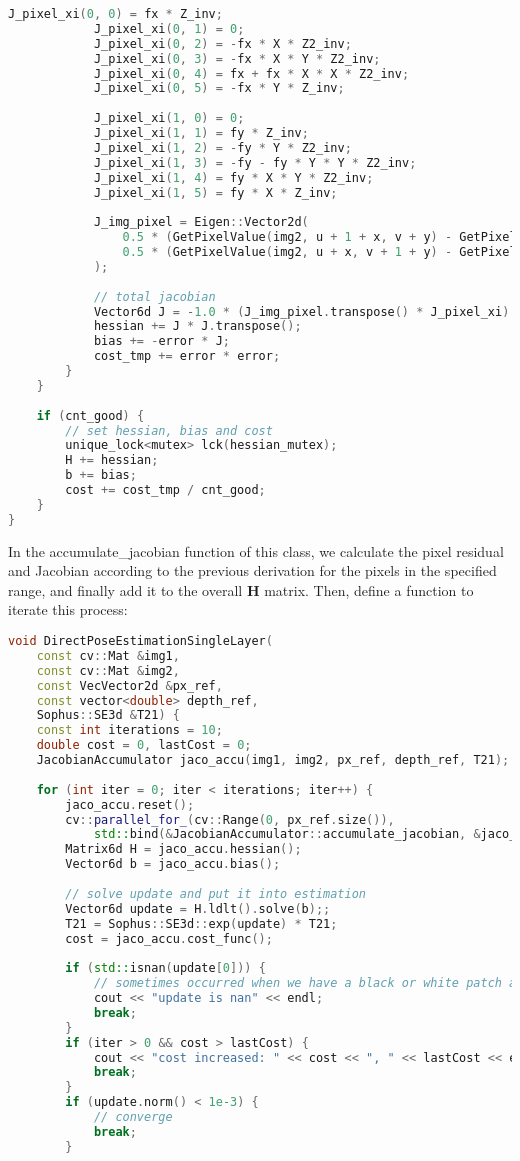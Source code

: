 {\begin{lstlisting}[language=c++,caption=slambook2/ch8/direct_method.cpp（片段）]
			J_pixel_xi(0, 0) = fx * Z_inv;
			J_pixel_xi(0, 1) = 0;
			J_pixel_xi(0, 2) = -fx * X * Z2_inv;
			J_pixel_xi(0, 3) = -fx * X * Y * Z2_inv;
			J_pixel_xi(0, 4) = fx + fx * X * X * Z2_inv;
			J_pixel_xi(0, 5) = -fx * Y * Z_inv;
			
			J_pixel_xi(1, 0) = 0;
			J_pixel_xi(1, 1) = fy * Z_inv;
			J_pixel_xi(1, 2) = -fy * Y * Z2_inv;
			J_pixel_xi(1, 3) = -fy - fy * Y * Y * Z2_inv;
			J_pixel_xi(1, 4) = fy * X * Y * Z2_inv;
			J_pixel_xi(1, 5) = fy * X * Z_inv;
			
			J_img_pixel = Eigen::Vector2d(
				0.5 * (GetPixelValue(img2, u + 1 + x, v + y) - GetPixelValue(img2, u - 1 + x, v + y)),
				0.5 * (GetPixelValue(img2, u + x, v + 1 + y) - GetPixelValue(img2, u + x, v - 1 + y))
			);
			
			// total jacobian
			Vector6d J = -1.0 * (J_img_pixel.transpose() * J_pixel_xi).transpose();
			hessian += J * J.transpose();
			bias += -error * J;
			cost_tmp += error * error;
		}
	}
	
	if (cnt_good) {
		// set hessian, bias and cost
		unique_lock<mutex> lck(hessian_mutex);
		H += hessian;
		b += bias;
		cost += cost_tmp / cnt_good;
	}
}
\end{lstlisting}

In the accumulate\_jacobian function of this class, we calculate the pixel residual and Jacobian according to the previous derivation for the pixels in the specified range, and finally add it to the overall $\bm{H}$ matrix. Then, define a function to iterate this process:
\begin{lstlisting}[language=c++,caption=slambook2/ch8/direct_method.cpp (snippet)]
void DirectPoseEstimationSingleLayer(
	const cv::Mat &img1,
	const cv::Mat &img2,
	const VecVector2d &px_ref,
	const vector<double> depth_ref,
	Sophus::SE3d &T21) {
	const int iterations = 10;
	double cost = 0, lastCost = 0;
	JacobianAccumulator jaco_accu(img1, img2, px_ref, depth_ref, T21);
	
	for (int iter = 0; iter < iterations; iter++) {
		jaco_accu.reset();
		cv::parallel_for_(cv::Range(0, px_ref.size()),
			std::bind(&JacobianAccumulator::accumulate_jacobian, &jaco_accu, std::placeholders::_1));
		Matrix6d H = jaco_accu.hessian();
		Vector6d b = jaco_accu.bias();
		
		// solve update and put it into estimation
		Vector6d update = H.ldlt().solve(b);;
		T21 = Sophus::SE3d::exp(update) * T21;
		cost = jaco_accu.cost_func();
		
		if (std::isnan(update[0])) {
			// sometimes occurred when we have a black or white patch and H is irreversible
			cout << "update is nan" << endl;
			break;
		}
		if (iter > 0 && cost > lastCost) {
			cout << "cost increased: " << cost << ", " << lastCost << endl;
			break;
		}
		if (update.norm() < 1e-3) {
			// converge
			break;
		}
		

\end{lstlisting}}
